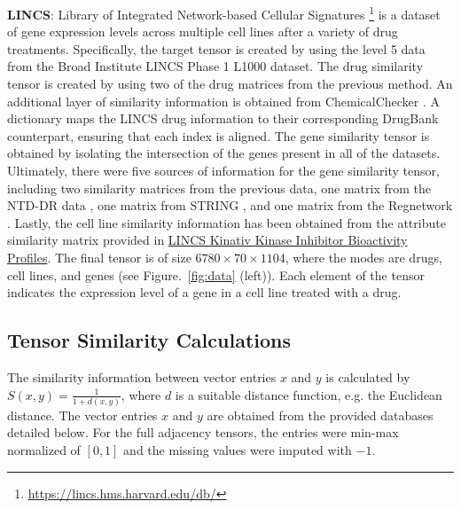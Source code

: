 \documentclass{article}
\begin{document}
\noindent\textbf{LINCS}: Library of Integrated Network-based Cellular Signatures \footnote{\url{https://lincs.hms.harvard.edu/db/}} is a dataset of gene expression levels across multiple cell lines after a variety of drug treatments. Specifically, the target tensor is created by using the level 5 data from the Broad Institute LINCS Phase 1 L1000 dataset. The drug similarity tensor is created by using two of the drug matrices from the previous method. An additional layer of similarity information is obtained from ChemicalChecker \cite{duran2020extending}. A dictionary maps the LINCS drug information to their corresponding DrugBank \cite{wishart2006drugbank} counterpart, ensuring that each index is aligned. The gene similarity tensor is obtained by isolating the intersection of the genes present in all of the datasets. Ultimately, there were five sources of information for the gene similarity tensor, including two similarity matrices from the previous data, one matrix from the NTD-DR data \cite{jamali2022ntd}, one matrix from STRING \cite{szklarczyk2021string}, and one matrix from the Regnetwork \cite{liu2015regnetwork}. Lastly, the cell line similarity information has been obtained from the attribute similarity matrix provided in \href{https://maayanlab.cloud/Harmonizome/dataset/LINCS+Kinativ+Kinase+Inhibitor+Bioactivity+Profiles}{LINCS Kinativ Kinase Inhibitor Bioactivity Profiles}. The final tensor is of size $6780\times 70\times 1104$, where the modes are drugs, cell lines, and genes (see Figure.~\ref{fig:data} (left)). Each element of the tensor indicates the expression level of a gene in a cell line treated with a drug.\\



 \subsection{Tensor Similarity Calculations} The similarity information between vector entries $x$ and $y$ is calculated by $S(x, y) = \frac{1}{1 + d(x, y)}$, where $d$ is a suitable distance function, e.g. the Euclidean distance. The vector entries $x$ and $y$ are obtained from the provided databases detailed below. For the full adjacency tensors, the entries were min-max normalized of $[0, 1]$ and the missing values were imputed with $-1$.
\end{document}
